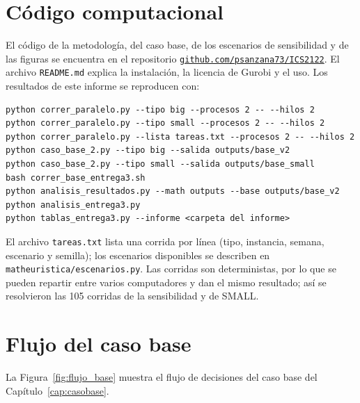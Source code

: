 \section{Código computacional}\label{ap:codigo}

El código de la metodología, del caso base, de los escenarios de sensibilidad y de las figuras se encuentra en el repositorio \href{https://github.com/psanzana73/ICS2122}{\texttt{github.com/psanzana73/ICS2122}}. El archivo \texttt{README.md} explica la instalación, la licencia de Gurobi y el uso. Los resultados de este informe se reproducen con:
\begin{verbatim}
python correr_paralelo.py --tipo big --procesos 2 -- --hilos 2
python correr_paralelo.py --tipo small --procesos 2 -- --hilos 2
python correr_paralelo.py --lista tareas.txt --procesos 2 -- --hilos 2
python caso_base_2.py --tipo big --salida outputs/base_v2
python caso_base_2.py --tipo small --salida outputs/base_small
bash correr_base_entrega3.sh
python analisis_resultados.py --math outputs --base outputs/base_v2
python analisis_entrega3.py
python tablas_entrega3.py --informe <carpeta del informe>
\end{verbatim}
El archivo \texttt{tareas.txt} lista una corrida por línea (tipo, instancia, semana, escenario y semilla); los escenarios disponibles se describen en \texttt{matheuristica/escenarios.py}. Las corridas son deterministas, por lo que se pueden repartir entre varios computadores y dan el mismo resultado; así se resolvieron las 105 corridas de la sensibilidad y de SMALL.

\section{Flujo del caso base}\label{ap:base}

La Figura~\ref{fig:flujo_base} muestra el flujo de decisiones del caso base del Capítulo~\ref{cap:casobase}.

